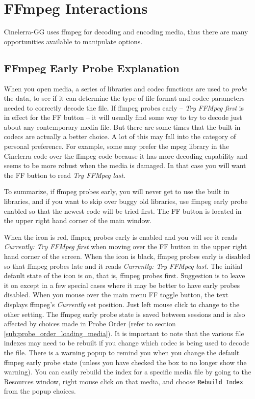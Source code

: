 \chapter{FFmpeg Interactions}%
\label{cha:ffmpeg_interactions}

Cinelerra-GG uses ffmpeg for decoding and encoding media, thus there are many opportunities available to manipulate options.

\section{FFmpeg Early Probe Explanation}%
\label{sec:ffmpeg_early_probe_explanation}

When you open media, a series of libraries and codec functions are used to \textit{probe} the data, to see if it can determine the type of file format and codec parameters needed to correctly decode the file.  If ffmpeg probes early -- \textit{Try FFMpeg first} is in effect for the FF button -- it will usually find some way to try to decode just about any contemporary media file.  But there are some times that the built in codecs are actually a better choice.  A lot of this may fall into the category of personal preference.  For example, some may prefer the mpeg library in the Cinelerra code over the ffmpeg code because it has more decoding capability and seems to be more robust when the media is damaged.  In that case you will want the FF button to read \textit{Try FFMpeg last}.

To summarize, if ffmpeg probes early, you will never get to use the built in libraries, and if you want to skip over buggy old libraries, use ffmpeg early probe enabled so that the newest code will be tried first.
The FF button is located in the upper right hand corner of the main window.

When the icon is red, ffmpeg probes early is enabled and you will see it reads
 \textit{Currently: Try FFMpeg first} when moving over the FF button in the upper 
right hand corner of the screen.  When the icon is black, ffmpeg probes early is disabled so that 
ffmpeg probes late and it reads \textit{Currently: Try FFMpeg last}.  The initial default state of 
the icon is on, that is, ffmpeg probes first. Suggestion is to leave it on except in a few special 
cases where it may be better to have early probes disabled.  When you mouse over the main menu FF 
toggle button, the text displays ffmpeg's \textit{Currently} set position.  Just left mouse click to change to the other setting.
The ffmpeg early probe state is saved between sessions and is also affected by choices made in Probe Order (refer to section \ref{sub:probe_order_loading_media}). It is important to note that the various file indexes may need to be rebuilt if you change which codec is being used to decode the file.  There is a warning popup to remind you when you change the default ffmpeg early probe state (unless you have checked the box to no longer show the warning).  You can easily rebuild the index for a specific media file by going to the Resources window, right mouse click on that media, and choose \texttt{Rebuild Index} from the popup choices.


